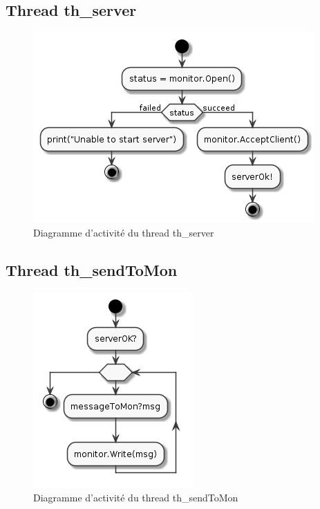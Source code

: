 \documentclass[11pt,a4paper]{paper}
\begin{document}
\subsection{Thread th\_server}

 \begin{figure}[htbp]
\begin{center}
\includegraphics[scale=0.4]{figures_pdf/activity/th_server}
\end{center}
\caption{Diagramme d'activité du thread th\_server}
\end{figure}
\FloatBarrier

\subsection{Thread th\_sendToMon}

 \begin{figure}[htbp]
\begin{center}
\includegraphics[scale=0.4]{figures_pdf/activity/th_sendToMon}
\end{center}
\caption{Diagramme d'activité du thread th\_sendToMon}
\end{figure}
\FloatBarrier
\end{document}
